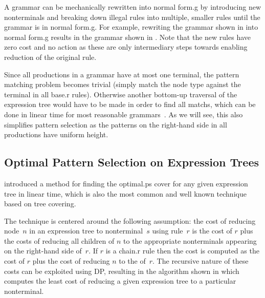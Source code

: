 A \gls{grammar} can be mechanically rewritten into \gls{normal form.g} by
introducing new \glspl{nonterminal} and breaking down illegal \glspl{rule} into
multiple, smaller \glspl{rule} until the \gls{grammar} is in \gls{normal
  form.g}.
%
For example, rewriting the \gls{grammar} shown in
 into \gls{normal form.g} results in the
\gls{grammar} shown in .
%
Note that the new \glspl{rule} have zero cost and no \gls{action} as these are
only intermediary steps towards enabling reduction of the original \gls{rule}.

Since all \glspl{production} in a  \gls{grammar} have at
most one \gls{terminal}, the \gls{pattern matching} problem becomes trivial
(simply match the \gls{node} type against the \gls{terminal} in all \gls{base.r}
\glspl{rule}).
%
Otherwise another bottom-up traversal of the \gls{expression tree} would have to
be made in order to find all \glspl{match}, which can be done in linear time for
most reasonable \glspl{grammar}~\cite{HoffmannODonnell:1982}.
%
As we will see, this also simplifies \gls{pattern selection} as the
\glspl{pattern} on the right-hand side in all \glspl{production} have uniform
height.


\subsection{Optimal Pattern Selection on Expression Trees}

\textcite{AhoEtAl:1989} introduced a method for finding the \gls{optimal.ps}
\gls{cover} for any given \gls{expression tree} in linear time, which is also
the most common and well known technique based on \gls{tree covering}.

The technique is centered around the following assumption: the cost of reducing
\gls{node}~$n$ in an \gls{expression tree} to \gls{nonterminal}~$s$ using
\gls{rule}~$r$ is the cost of $r$ plus the costs of reducing all children of $n$
to the appropriate \glspl{nonterminal} appearing on the right-hand side of~$r$.
%
If $r$ is a \gls{chain.r} \gls{rule} then the cost is computed as the cost of
$r$ plus the cost of reducing $n$ to the  of~$r$.
%
The recursive nature of these costs can be exploited using \glsdesc{DP},
resulting in the algorithm shown in  which
computes the least cost of reducing a given \gls{expression tree} to a
particular \gls{nonterminal}.

